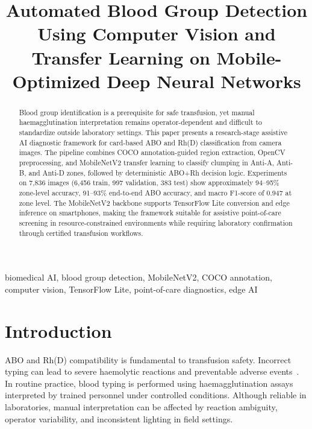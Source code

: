 \documentclass[conference]{IEEEtran}
\begin{document}
\title{Automated Blood Group Detection Using Computer Vision and Transfer Learning on Mobile-Optimized Deep Neural Networks}

\author{
}

\maketitle

\begin{abstract}
Blood group identification is a prerequisite for safe transfusion, yet manual haemagglutination interpretation remains operator-dependent and difficult to standardize outside laboratory settings. This paper presents a research-stage assistive AI diagnostic framework for card-based ABO and Rh(D) classification from camera images. The pipeline combines COCO annotation-guided region extraction, OpenCV preprocessing, and MobileNetV2 transfer learning to classify clumping in Anti-A, Anti-B, and Anti-D zones, followed by deterministic ABO+Rh decision logic. Experiments on 7,836 images (6,456 train, 997 validation, 383 test) show approximately 94--95\% zone-level accuracy, 91--93\% end-to-end ABO accuracy, and macro F1-score of 0.947 at zone level. The MobileNetV2 backbone supports TensorFlow Lite conversion and edge inference on smartphones, making the framework suitable for assistive point-of-care screening in resource-constrained environments while requiring laboratory confirmation through certified transfusion workflows.
\end{abstract}

\begin{IEEEkeywords}
biomedical AI, blood group detection, MobileNetV2, COCO annotation, computer vision, TensorFlow Lite, point-of-care diagnostics, edge AI
\end{IEEEkeywords}

\section{Introduction}
ABO and Rh(D) compatibility is fundamental to transfusion safety. Incorrect typing can lead to severe haemolytic reactions and preventable adverse events~\cite{lippi2011}. In routine practice, blood typing is performed using haemagglutination assays interpreted by trained personnel under controlled conditions. Although reliable in laboratories, manual interpretation can be affected by reaction ambiguity, operator variability, and inconsistent lighting in field settings.
\end{document}

